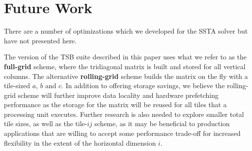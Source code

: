 \documentclass[10pt, conference, compsocconf]{IEEEtran}
\begin{document}
\section{Future Work}
\label{sec:future}

There are a number of optimizations which we developed for the SSTA
  solver but have not presented here. 

The version of the TSB suite described in this paper uses what we refer to as
  the \textbf{full-grid} scheme, where the tridiagonal matrix is built and stored
  for all vertical columns.
The alternative \textbf{rolling-grid} scheme builds the matrix on the fly with
  a tile-sized \(a\), \(b\) and \(c\).
In addition to offering storage savings, we believe the rolling-grid scheme
  will further improve data locality and hardware prefetching performance as the
  storage for the matrix will be reused for all tiles that a processing
  unit executes.
Further research is also needed to explore smaller total tile sizes, as well as
  the tile-\(ij\) scheme, as it may be beneficial to production applications that
  are willing to accept some performance trade-off for increased flexibility in
  the extent of the horizontal dimension \(i\).

\end{document}
